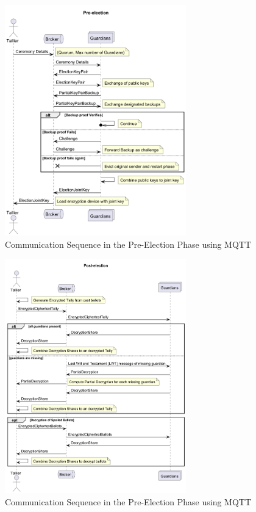 \begin{figure}[ht!]
    \centering
    \includegraphics[width=0.7\textwidth]{abbildungen/Diagramme/communication-seq0-mqtt.png}
    \caption{Communication Sequence in the Pre-Election Phase using \ac{MQTT}}\label{fig:mqtt-pre}
\end{figure}

\begin{figure}[ht!]
    \centering
    \includegraphics[width=0.7\textwidth]{abbildungen/Diagramme/communication-seq2-mqtt.png}
    \caption{Communication Sequence in the Pre-Election Phase using \ac{MQTT}}\label{fig:mqtt-post}
\end{figure}

